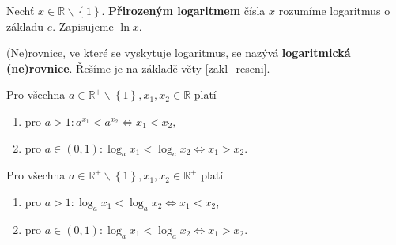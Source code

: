 \begin{definition}
    Nechť $x \in \mathbb R\smallsetminus\left \{ 1 \right \}. $ \textbf{Přirozeným logaritmem} čísla $x$
    rozumíme logaritmus o základu $e$. Zapisujeme $\ln x.$
\end{definition}

\begin{definition}
    (Ne)rovnice, ve které se vyskytuje logaritmus, se nazývá \textbf{logaritmická (ne)rovnice}.
    Řešíme je na základě věty \ref{zakl_reseni}.
\end{definition}

\begin{veta}
    Pro všechna $a \in \mathbb R^+ \smallsetminus \left \{ 1 \right \} , x_1, x_2
    \in \mathbb R$ platí
    \begin{enumerate}[$i.$]
        \item pro $a>1\colon a^{x_1}<a^{x_2}\iff x_1 < x_2,$
       	\item pro $a \in (0,1)\colon \log_a x_1 < \log_a x_2 \iff x_1 > x_2.$
    \end{enumerate}
\end{veta}

\begin{veta}
    Pro všechna $a \in \mathbb R^+ \smallsetminus \left \{ 1 \right \} , x_1, x_2
    \in \mathbb R^+$ platí
    \begin{enumerate}[$i.$]
        \item pro $a>1\colon\log_a x_1 < \log_a x_2 \iff x_1 < x_2$,
       	\item pro $a\in (0,1)\colon \log_a x_1 < \log_a x_2 \iff x_1 > x_2.$
    \end{enumerate}
\end{veta}
